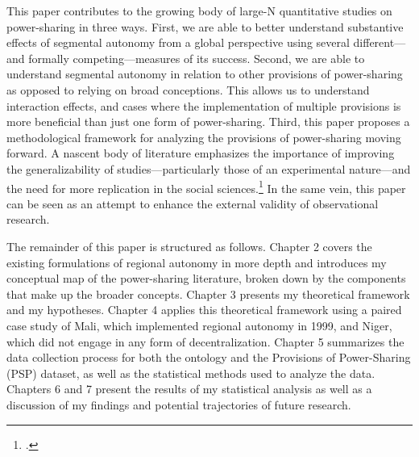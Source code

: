\documentclass[12pt]{article}
\begin{document}
This paper contributes to the growing body of large-N quantitative studies on power-sharing in three ways. First, we are able to better understand substantive effects of segmental autonomy from a global perspective using several different---and formally competing---measures of its success. Second, we are able to understand segmental autonomy in relation to other provisions of power-sharing as opposed to relying on broad conceptions. This allows us to understand interaction effects, and cases where the implementation of multiple provisions is more beneficial than just one form of power-sharing. Third, this paper proposes a methodological framework for analyzing the provisions of power-sharing moving forward. A nascent body of literature emphasizes the importance of improving the generalizability of studies---particularly those of an experimental nature---and the need for more replication in the social sciences.\footcite{dunning_information_2020, dunning_replicate_2014} In the same vein, this paper can be seen as an attempt to enhance the external validity of observational research. 

The remainder of this paper is structured as follows. Chapter 2 covers the existing formulations of regional autonomy in more depth and introduces my conceptual map of the power-sharing literature, broken down by the components that make up the broader concepts. Chapter 3 presents my theoretical framework and my hypotheses. Chapter 4 applies this theoretical framework using a paired case study of Mali, which implemented regional autonomy in 1999, and Niger, which did not engage in any form of decentralization. Chapter 5 summarizes the data collection process for both the ontology and the Provisions of Power-Sharing (PSP) dataset, as well as the statistical methods used to analyze the data. Chapters 6 and 7 present the results of my statistical analysis as well as a discussion of my findings and potential trajectories of future research. 
\end{document}
